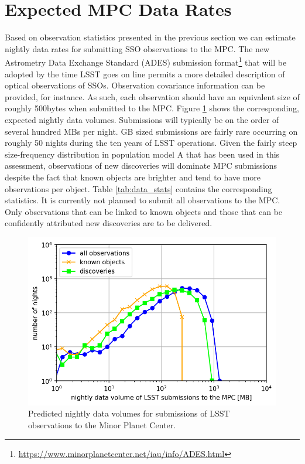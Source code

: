 \section{Expected MPC Data Rates}\label{sec:data}
Based on observation statistics presented in the previous section we can estimate nightly data rates for submitting SSO observations to the MPC. The new Astrometry Data Exchange Standard (ADES) submission format\footnote{\url{https://www.minorplanetcenter.net/iau/info/ADES.html}} that will be adopted by the time LSST goes on line permits a more detailed description of optical observations of SSOs. Observation covariance information can be provided, for instance. As such, each observation should have an equivalent size of roughly 500bytes when submitted to the MPC. Figure \ref{fig:data} shows the corresponding, expected nightly data volumes. Submissions will typically be on the order of several hundred MBs per night. GB sized submissions are fairly rare occurring on roughly 50 nights during the ten years of LSST operations. Given the fairly steep size-frequency distribution in population model A that has been used in this assessment, observations of new discoveries will dominate MPC submissions despite the fact that known objects are brighter and tend to have more observations per object. Table \ref{tab:data_stats} contains the corresponding statistics. It is currently not planned to submit all observations to the MPC. Only observations
that can be linked to known objects and those that can be confidently attributed new discoveries are to be delivered. 


\begin{figure}[tb!]
\begin{center}
\includegraphics[width=0.70\linewidth]{figs/data2.png}
\end{center}
\caption{Predicted nightly data volumes for submissions of LSST observations to the Minor Planet Center.}
\label{fig:data}       %
\end{figure}
\clearpage

